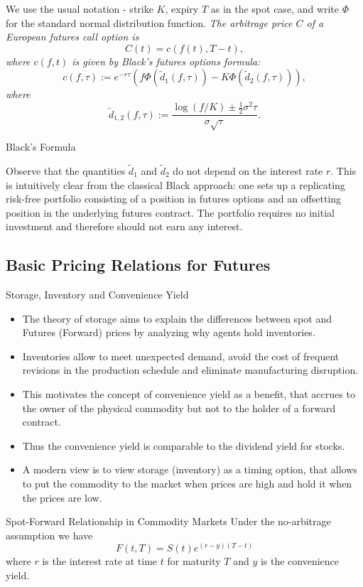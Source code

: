 {We use the usual notation -
strike $K$, expiry $T$ as in the spot case, and write $\Phi$ for the
standard normal distribution function.
{\it
The arbitrage price $C$ of a European futures call option is
$$
C(t)= c(f(t), T-t),
$$
where $c(f,t)$ is given by Black's futures options formula:
$$
c(f,\tau) := e^{-r\tau} (f \Phi(\tilde{d}_1 (f,\tau)) - K \Phi(\tilde{d}_2 (f,\tau))),
$$
where
$$
\tilde{d}_{1,2} (f,\tau) := \frac{\log (f/K) \pm \frac{1}{2} {\sigma}^2 \tau}{
\sigma \sqrt{\tau}}.
$$
}

{Black's Formula}

Observe that the quantities $\tilde{d}_1$ and $\tilde{d}_2$ do not depend on the
interest rate $r$. This is intuitively clear from the classical
Black approach: one sets up a replicating risk-free portfolio
consisting of a position in futures options and an offsetting
position in the underlying futures contract. The portfolio
requires no initial investment and therefore should not earn any
interest.

\subsection{Basic Pricing Relations for Futures}

{Storage, Inventory and Convenience Yield}
\begin{itemize}
\item<1-> The theory of storage aims to explain the differences between spot
and Futures (Forward) prices by analyzing why agents hold inventories.
\item<2-> Inventories
allow to meet unexpected demand, avoid the cost of frequent revisions in
the production schedule and eliminate manufacturing disruption.
\item<3-> This
motivates the concept of convenience yield as a benefit, that accrues to the
owner of the physical commodity but not to the holder of a forward contract.
\item<4-> Thus the convenience yield is comparable to the dividend yield for stocks.
\item<5-> A modern view is to view storage (inventory) as a timing option, that
allows to put the commodity to the market when prices are high
and hold it when the prices are low.
\end{itemize}

{Spot-Forward Relationship in Commodity Markets }
Under the no-arbitrage assumption we have
\begin{equation}\label{SF-rel}
F(t,T)=S(t)e^{(r-y)(T-t)}
\end{equation}
where $r$ is the interest rate at time $t$ for maturity $T$ and $y$ is the convenience yield.

}
